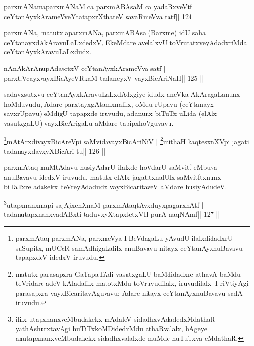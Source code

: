 \begin{shl}
parxmANamaparxmANaM ca parxmABAsaM ca yadaBxveVtf |
ceYtanAyxkArameVveYtatapxrXthateV savaRmeVva tatf\hfill || 124 ||
\end{shl}

\begin{artha}
parxmANa, matutx aparxmANa, parxmABAsa (Barxme) idU saha ceYtanayxdAkAravuLaLxdedxV, EkeMdare avelalxvU toVrutatxveyAdadxriMda ceYtanAyxkAravuLaLxdudx.
\end{artha}


\begin{shl}
nAnAkArAnupAdatetxV ceYtanAyxkArameVva satf |
parxtiVcayxvayxBicAyeVRkaM tadaneyxV vayxBicAriNaH\hfill || 125 ||
\end{shl}

\begin{artha}
sadavxsutxvu ceYtanAyxkAravuLaLxdAdxgiye idudx aneVka AkAragaLanunx hoMduvudu, Adare parxtayxgAtamxnalilx, oMdu rUpavu (ceYtanayx savxrUpavu) eMdigU tapapxde iruvudu, adanunx biTuTx uLida (elAlx vasutxgaLU) vayxBicArigaLu aMdare tapipxhoVguvavu.
\end{artha}

\begin{shl}
\footnote{parxmAtaq parxmANa, parxmeVya I BeVdagaLu yAvudU ilalxdidadxrU suSupitx, mUCeR samAdhigaLalilx anuBavavu nitayx ceYtanAyxnuBavavu tapapxdeV idedxV iruvudu.}mAtArxdivayxBicAreV\s pi saMvidavayxBicAriNiV |
\footnote{matutx parasapxra GaTapaTAdi vasutxgaLU baMdidadxre athavA baMdu toVridare adeV kAladalilx matotxMdu toVruvudilalx, iruvudilalx. I riVtiyAgi parasapxra vayxBicaritavAguvavu; Adare nitayx ceYtanAyxnuBavavu sadA iruvudu.}mithaH kaqtesxnXV\s pi jagati tadanayxdavxyXBicAri tu\hfill || 126 ||
\end{shl}

\begin{artha}
parxmAtaq muMtAdavu husiyAdarU ilalxde hoVdarU saMvitf eMbuva anuBavavu idedxV iruvudu, matutx elAlx jagatitxnalUlx saMvitftxnunx biTaTxre adakekx beVreyAdadudx vayxBicaritaveV aMdare husiyAdudeV.
\end{artha}

\begin{shl}
\footnote{ililx utapxnanxveMbudakekx mAdaleV sidadhxvAdadedxMdathaR yathAshurxtavAgi huTiTxkoMDidedxMdu athaRvalalx, hAgeye anutapxnanxveMbudakekx sidadhxvalalxde muMde huTuTxva eMdathaR.}utapxnanxmapi sajAjxcnXnaM parxmAtaqtAvxduyxpagarxhAtf |
\footnotemark[\value{footnote}]tadanutapxnanxvadABxti taduvxyXtapxtetxVH purA naqNAmf\hfill || 127 ||
\end{shl}

